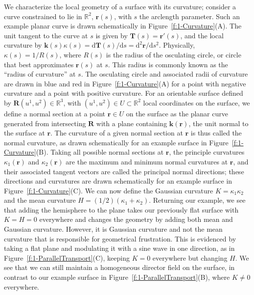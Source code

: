 We characterize the local geometry of a surface with its curvature; consider a curve constrained to lie in $\mathbb{R}^2$, $\mathbf{r}(s)$, with $s$ the arclength parameter.
Such an example planar curve is drawn schematically in Figure~\ref{f:1-Curvature}(A).
The unit tangent to the curve at $s$ is given by $\mathbf{T}(s) = \mathbf{r}'(s)$, and the local curvature by $\mathbf{k}(s)\kappa(s) = \textrm{d} \mathbf{T}(s)/\textrm{d}s = \textrm{d}^2\mathbf{r}/\textrm{d}s^2 $.
Physically, $\kappa(s) = 1/R(s)$, where $R(s)$ is the radius of the osculating circle, or circle that best approximates $\mathbf{r}(s)$ at $s$.
This radius is commonly known as the ``radius of curvature'' at $s$.
The osculating circle and associated radii of curvature are drawn in blue and red in Figure~\ref{f:1-Curvature}(A) for a point with negative curvature and a point with positive curvature.
For an orientable surface defined by $\mathbf{R}(u^1,u^2) \in \mathbb{R}^3$, with $(u^1,u^2) \in U \subset \mathbb{R}^2$ local coordinates on the surface, we define a normal section at a point $\mathbf{r} \in U$ on the surface as the planar curve generated from intersecting $\mathbf{R}$ with a plane containing $\mathbf{k}(\mathbf{r})$, the unit normal to the surface at $\mathbf{r}$.
The curvature of a given normal section at $\mathbf{r}$ is thus called the normal curvature, as drawn schematically for an example surface in Figure~\ref{f:1-Curvature}(B).
Taking all possible normal sections at $\mathbf{r}$, the principle curvatures $\kappa_1 (\mathbf{r})$ and $\kappa_2(\mathbf{r})$ are the maximum and minimum normal curvatures at $\mathbf{r}$, and their associated tangent vectors are called the principal normal directions; these directions and curvatures are drawn schematically for an example surface in Figure~\ref{f:1-Curvature}(C).
We can now define the Gaussian curvature $K  = \kappa_1 \kappa_2$ and the mean curvature $H = (1/2) (\kappa_1+\kappa_2)$.
Returning our example, we see that adding the hemisphere to the plane takes our previously flat surface with $K = H = 0$ everywhere and changes the geometry by adding both mean and Gaussian curvature.
However, it is Gaussian curvature and not the mean curvature that is responsible for geometrical frustration.
This is evidenced by taking a flat plane and modulating it with a sine wave in one direction, as in Figure~\ref{f:1-ParallelTransport}(C), keeping $K=0$ everywhere but changing $H$.
We see that we can still maintain a homogeneous director field on the surface, in contrast to our example surface in Figure~\ref{f:1-ParallelTransport}(B), where $K \neq 0$ everywhere.
